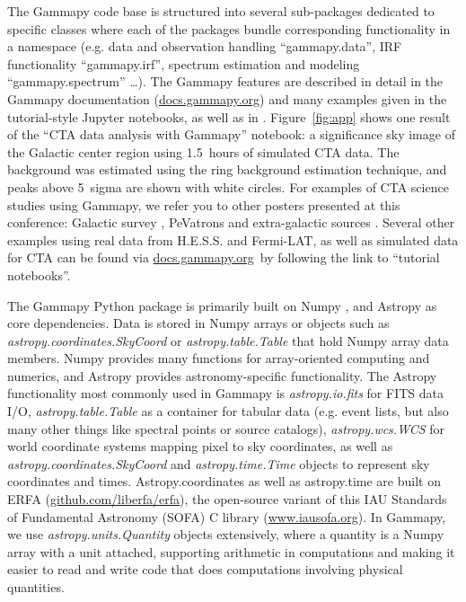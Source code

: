 \documentclass{PoS}
\newcommand{\urlGammapyDocs}{\href{http://docs.gammapy.org}{docs.gammapy.org}}
\newcommand{\urlErfa}{\href{https://github.com/liberfa/erfa}{github.com/liberfa/erfa}}
\newcommand{\urlSofa}{\href{http://www.iausofa.org}{www.iausofa.org}}
\begin{document}
The Gammapy code base is structured into several sub-packages dedicated to
specific classes  where each of the packages bundle corresponding functionality
in a namespace (e.g. data and observation handling ``gammapy.data'', IRF
functionality ``gammapy.irf'', spectrum  estimation and modeling
``gammapy.spectrum'' \ldots). The Gammapy features are described in detail in
the Gammapy documentation (\urlGammapyDocs) and many examples given in the
tutorial-style Jupyter notebooks, as well as in \cite{gammapy-icrc2015}.
Figure~\ref{fig:app} shows one result of the ``CTA data analysis with Gammapy''
notebook: a significance sky image of the Galactic center region using 1.5~hours
of simulated CTA data. The background was estimated using the ring background
estimation technique, and peaks above 5~sigma are shown with white circles. For
examples of CTA science studies using Gammapy, we refer you to other posters
presented at this conference: Galactic survey \cite{roberta}, PeVatrons
\cite{cyril} and extra-galactic sources \cite{julien}. Several other examples
using real data from H.E.S.S. and Fermi-LAT, as well as simulated data for CTA
can be found via \urlGammapyDocs\ by following the link to ``tutorial
notebooks''.
 
The Gammapy Python package is primarily built on Numpy \cite{numpy}, and Astropy
\cite{astropy} as core dependencies. Data is stored in Numpy arrays or objects
such as {\it astropy.coordinates.SkyCoord} or {\it astropy.table.Table} that
hold Numpy array data members. Numpy provides many functions for array-oriented
computing and numerics, and Astropy provides astronomy-specific functionality.
The Astropy functionality most commonly used in Gammapy is {\it astropy.io.fits}
for FITS data I/O, {\it astropy.table.Table} as a container for tabular data
(e.g. event lists, but also many other things like spectral points or source
catalogs), {\it astropy.wcs.WCS} for world coordinate systems mapping pixel to
sky coordinates, as well as {\it astropy.coordinates.SkyCoord} and {\it
astropy.time.Time} objects to represent sky coordinates and times.
Astropy.coordinates  as well as astropy.time are built on ERFA (\urlErfa), the
open-source variant of this IAU Standards of Fundamental Astronomy (SOFA) C
library (\urlSofa). In Gammapy, we use {\it astropy.units.Quantity} objects
extensively, where a quantity is a Numpy array with a unit attached, supporting
arithmetic in computations and making it easier to read and write code that does
computations involving physical quantities.
\end{document}
